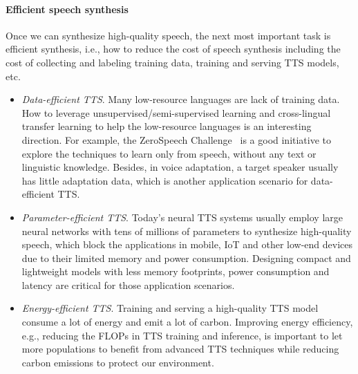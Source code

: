 \documentclass{article}
\begin{document}
\paragraph{Efficient speech synthesis} Once we can synthesize high-quality speech, the next most important task is efficient synthesis, i.e., how to reduce the cost of speech synthesis including the cost of collecting and labeling training data, training and serving TTS models, etc.
\begin{itemize}[leftmargin=*]
\item \textit{Data-efficient TTS}. Many low-resource languages are lack of training data. How to leverage unsupervised/semi-supervised learning and cross-lingual transfer learning to help the low-resource languages is an interesting direction. For example, the ZeroSpeech Challenge~\cite{zerospeechchallenge} is a good initiative to explore the techniques to learn only from speech, without any text or linguistic knowledge. Besides, in voice adaptation, a target speaker usually has little adaptation data, which is another application scenario for data-efficient TTS. 


\item \textit{Parameter-efficient TTS}. Today’s neural TTS systems usually employ large neural networks with tens of millions of parameters to synthesize high-quality speech, which block the applications in mobile, IoT and other low-end devices due to their limited memory and power consumption. Designing compact and lightweight models with less memory footprints, power consumption and latency are critical for those application scenarios. 

\item \textit{Energy-efficient TTS}. Training and serving a high-quality TTS model consume a lot of energy and emit a lot of carbon. Improving energy efficiency, e.g., reducing the FLOPs in TTS training and inference, is important to let more populations to benefit from advanced TTS techniques while reducing carbon emissions to protect our environment.  
\end{itemize}




\iffalse
1. voice quality 
2. data/computation/memory/development cost
3. Spontaneous style, like human
4. robustness to different domain, style, scenarios
5. fully end-to-end TTS
6. better pipeline, intermediate representation, other than mel-speptrogram
7. combines DSP with NN
8. semi-/unsupervised learning, pre-training, representation learning, generative pre-training
9. voice conversion, audio-visual speech synthesis, speech translation and cross-lingual speech synthesis, voice beautify
10. computation and quality  tradeoff  diffussion model, edge devices
11. low-resource languages
12. Style/Control 
\fi
\end{document}
